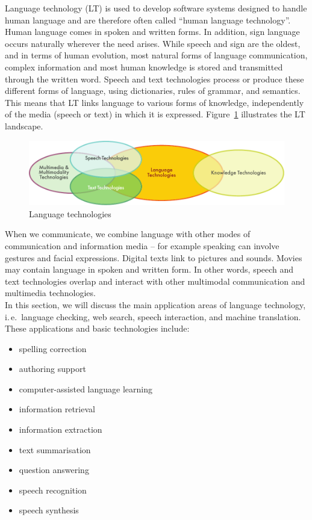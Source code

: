 \begin{multicols}{2}

Language technology (LT) is used to develop software systems designed
to handle human language and are therefore often called ``human
language technology''. Human language comes in spoken and written
forms. In addition, sign language occurs naturally wherever the
need arises. While speech and sign are the oldest, and in terms of
human evolution, most natural forms of language communication,
complex information and most human knowledge is stored and transmitted
through the written word. Speech and text technologies process or
produce these different forms of language, using dictionaries, rules
of grammar, and semantics. This means that LT links
language to various forms of knowledge, independently of the media
(speech or text) in which it is
expressed. Figure~\ref{fig:ltincontext_en} illustrates the LT
landscape.

\begin{figure}[htb]
  \center
  \includegraphics[width=\textwidth]{../_media/english/language_technologies}
  \caption{Language technologies}
  \label{fig:ltincontext_en}
\end{figure}

When we communicate, we combine language with other modes of communication and information media -- for example speaking can involve gestures and facial expressions. Digital texts link to pictures and sounds. Movies may contain language in spoken and written form. In other words, speech and text technologies overlap and interact with other multimodal communication and multimedia technologies.\\ 
In this section, we will discuss the main application areas of language technology, i.\,e.~language checking, web search, speech interaction, and machine translation. These applications and basic technologies include: 

\begin{itemize}
\item spelling correction
\item authoring support
\item computer-assisted language learning
\item information retrieval 
\item information extraction
\item text summarisation
\item question answering
\item speech recognition 
\item speech synthesis 
\end{itemize}


\end{multicols}
